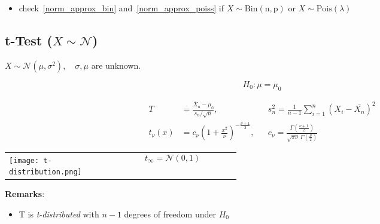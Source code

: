 \begin{itemize}
    \item check~\ref{norm_approx_bin} and~\ref{norm_approx_poiss} if $X\sim \mathrm{Bin(n,p)}$ or $X\sim \mathrm{Pois}(\lambda)$
\end{itemize}

\subsection[t-Test]{t-Test ($X\sim\mathcal{N}$)}
$X\sim\mathcal{N}(\mu,\sigma^2), \quad \sigma, \mu$ are unknown.

\noindent\begin{equation*}
    H_0:\mu=\mu_0
\end{equation*}

\noindent\begin{align*}
    T        & =\frac{\bar{X}_n-\mu_0}{s_n/\sqrt{n}},                      &  & s_n^2=\frac{1}{n-1}\sum_{i=1}^{n}{(X_i-\bar{X_n})}^2                       \\
    t_\nu(x) & = c_\nu{\left(1+\frac{x^2}{\nu}\right)}^{-\frac{\nu+1}{2}}, &  & c_\nu=\frac{\Gamma(\frac{\nu+1}{2})}{\sqrt{\pi\nu}\,\Gamma(\frac{\nu}{2})}
\end{align*}

\setlength{\oldtabcolsep}{\tabcolsep}\setlength\tabcolsep{0pt}

\begin{tabularx}{\linewidth}{@{}p{0.45\linewidth}X@{}}
    \noindent\texttt{[image: t-distribution.png]}
     & 
    \begin{equation*}
        t_\infty = \mathcal{N}(0,1)
    \end{equation*}
\end{tabularx}

\setlength\tabcolsep{\oldtabcolsep}

\textbf{Remarks}:
\begin{itemize}
    \item T is \textit{t-distributed} with $n-1$ degrees of freedom under $H_0$
\end{itemize}

